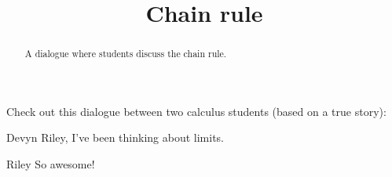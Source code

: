 \documentclass{ximera}
\title[Break-Ground:]{Chain rule}
\begin{document}
\begin{abstract}
A dialogue where students discuss the chain rule.
\end{abstract}
\maketitle

Check out this dialogue between two calculus students (based on a true story):

\begin{dialogue}
\item[Devyn] Riley, I've been thinking about limits.
\item[Riley] So awesome!
\end{dialogue}







\end{document}
